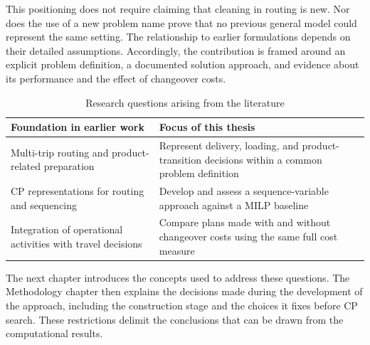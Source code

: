 This positioning does not require claiming that cleaning in routing is new.
Nor does the use of a new problem name prove that no previous general model
could represent the same setting. The relationship to earlier formulations
depends on their detailed assumptions. Accordingly, the contribution is
framed around an explicit problem definition, a documented solution
approach, and evidence about its performance and the effect of changeover
costs.

\begin{table}[htbp]
  \centering
  \small
  \caption{Research questions arising from the literature}
  \label{tab:research-gap}
  \begin{tabularx}{\textwidth}{@{}XX@{}}
    \toprule
    Foundation in earlier work & Focus of this thesis \\
    \midrule
    Multi-trip routing and product-related preparation
      & Represent delivery, loading, and product-transition decisions within
        a common problem definition \\[0.5em]
    CP representations for routing and sequencing
      & Develop and assess a sequence-variable approach against a MILP
        baseline \\[0.5em]
    Integration of operational activities with travel decisions
      & Compare plans made with and without changeover costs using the same
        full cost measure \\
    \bottomrule
  \end{tabularx}
\end{table}

The next chapter introduces the concepts used to address these questions.
The Methodology chapter then explains the decisions made during the
development of the approach, including the construction stage and the
choices it fixes before CP search. These restrictions delimit the conclusions
that can be drawn from the computational results.
